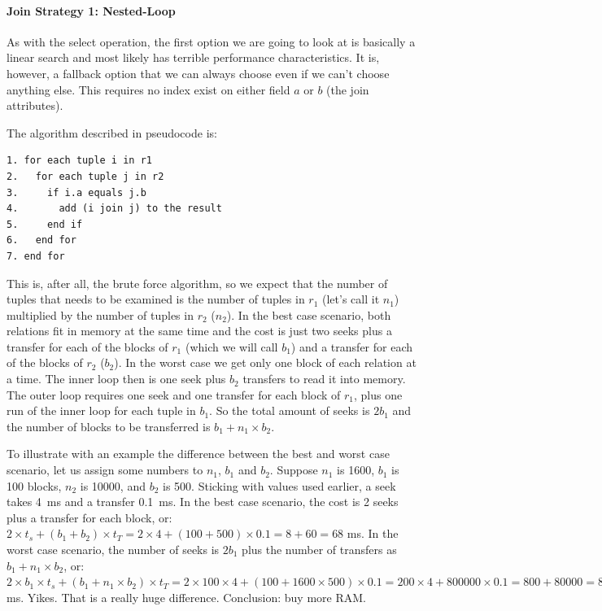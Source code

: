 \paragraph{Join Strategy 1: Nested-Loop}
As with the select operation, the first option we are going to look at is basically a linear search and most likely has terrible performance characteristics. It is, however, a fallback option that we can always choose even if we can't choose anything else. This requires no index exist on either field $a$ or $b$ (the join attributes).

The algorithm described in pseudocode is:
\begin{verbatim}
1. for each tuple i in r1
2.   for each tuple j in r2
3.     if i.a equals j.b
4.       add (i join j) to the result
5.     end if
6.   end for
7. end for
\end{verbatim}

This is, after all, the brute force algorithm, so we expect that the number of tuples that needs to be examined is the number of tuples in $r_{1}$ (let's call it $n_{1}$) multiplied by the number of tuples in $r_{2}$ ($n_{2}$). In the best case scenario, both relations fit in memory at the same time and the cost is just two seeks plus a transfer for each of the blocks of $r_{1}$ (which we will call $b_{1}$) and a transfer for each of the blocks of $r_{2}$ ($b_{2}$). In the worst case we get only one block of each relation at a time. The inner loop then is one seek plus $b_{2}$ transfers to read it into memory. The outer loop requires one seek and one transfer for each block of $r_{1}$, plus one run of the inner loop for each tuple in $b_{1}$. So the total amount of seeks is $2 b_{1}$ and the number of blocks to be transferred is $b_{1} + n_{1} \times b_{2}$.

To illustrate with an example the difference between the best and worst case scenario, let us assign some numbers to $n_{1}$, $b_{1}$ and $b_{2}$. Suppose $n_{1}$ is 1600, $b_{1}$ is 100 blocks, $n_{2}$ is 10000, and $b_{2}$ is 500. Sticking with values used earlier, a seek takes 4~ms and a transfer 0.1~ms. In the best case scenario, the cost is 2 seeks plus a transfer for each block, or: $2 \times t_{s} + (b_{1} + b_{2}) \times t_{T} = 2 \times 4 + (100 + 500) \times 0.1 = 8 + 60 = 68$ ms. In the worst case scenario, the number of seeks is $2b_{1}$ plus the number of transfers as $b_{1} + n_{1} \times b_{2}$, or: $2 \times b_{1} \times t_{s} + (b_{1} + n_{1} \times b_{2}) \times t_{T} = 2 \times 100 \times 4 + (100 + 1600 \times 500) \times 0.1 = 200 \times 4 + 800000 \times 0.1 = 800 + 80000 = 80800$ ms. Yikes. That is a really huge difference. Conclusion: buy more RAM.

